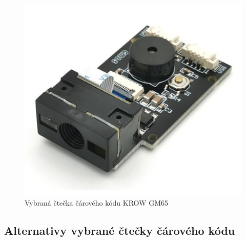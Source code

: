 \begin{figure}[!h]
    \begin{center}
        \includegraphics[scale=0.25]{obrazky/gm65.PNG} %
    \end{center}
    \caption{Vybraná čtečka čárového kódu KROW GM65 \cite{scaner}}
    \label{gm65}
\end{figure}





\subsection{Alternativy vybrané čtečky čárového kódu}

